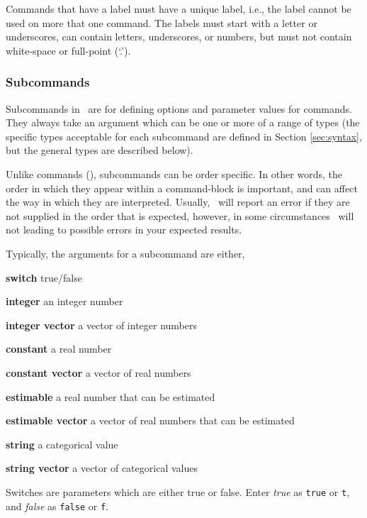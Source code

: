 Commands that have a label must have a unique label, i.e., the label cannot be used on more that one command. The labels must start with a letter or underscores, can contain letters, underscores, or numbers, but must not contain white-space or full-point (`.').

\subsubsection{Subcommands}

Subcommands in \SPM\ are for defining options and parameter values for commands. They always take an argument which can be one or more of a range of types (the specific types acceptable for each subcommand are defined in Section \ref{sec:syntax}, but the general types are described below). 

Unlike commands (), subcommands can be order specific. In other words, the order in which they appear within a command-block is important, and can affect the way in which they are interpreted. Usually, \SPM\ will report an error if they are not supplied in the order that is expected, however, in some circumstances \SPM\ will not \textemdash leading to possible errors in your expected results.  

Typically, the arguments for a subcommand are either,

\begin{description}
\item \textbf{switch} true/false 
\item \textbf{integer} an integer number
\item \textbf{integer vector} a vector of integer numbers
\item \textbf{constant} a real number 
\item \textbf{constant vector} a vector of real numbers
\item \textbf{estimable} a real number that can be estimated
\item \textbf{estimable vector} a vector of real numbers that can be estimated
\item \textbf{string} a categorical value
\item \textbf{string vector} a vector of categorical values
\end{description}

Switches are parameters which are either true or false. Enter \emph{true} as \texttt{true} or \texttt{t}, and \emph{false} as \texttt{false} or \texttt{f}. 

